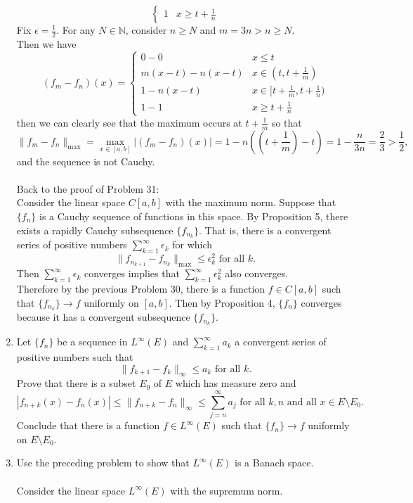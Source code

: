\begin{enumerate}
\[\begin{cases}
            1 &x\ge t+\frac{1}{n}
        \end{cases}
    \]
	Fix $\epsilon=\frac{1}{2}$.
	For any $N\in\mathbb{N}$, consider $n\ge N$ and $m=3n>n\ge N$. 
	\\Then we have
	\[
        (f_m-f_n)(x)=
        \begin{cases}
            0-0 &x\le t\\
            m(x-t)-n(x-t)&x\in(t,t+\frac{1}{m})\\
            1-n(x-t)&x\in[t+\frac{1}{m},t+\frac{1}{n})\\
            1-1 &x\ge t+\frac{1}{n}
        \end{cases}
	\]
	then we can clearly see that the maximum occurs at $t+\frac{1}{m}$ so that 
	\[
		\|f_m-f_n\|_{\max}=\max_{x\in[a,b]}|(f_m-f_n)(x)|=1-n((t+\frac{1}{m})-t)=1-\frac{n}{3n}=\frac{2}{3}>\frac{1}{2},
	\]
	and the sequence is not Cauchy.\\
	\\Back to the proof of Problem 31:
	\\Consider the linear space $C[a,b]$ with the maximum norm. 
	Suppose that $\{f_n\}$ is a Cauchy sequence of functions in this space.
	By Proposition 5, there exists a rapidly Cauchy subsequence $\{f_{n_k}\}$.
	That is, there is a convergent series of positive numbers $\sum_{k=1}^\infty\epsilon_k$ for which
	\[
		\|f_{n_{k+1}}-f_{n_k}\|_{\max}\le\epsilon_k^2\text{ for all }k.
	\]
	Then $\sum_{k=1}^\infty\epsilon_k$ converges implies that $\sum_{k=1}^\infty\epsilon_k^2$ also converges.
	\\Therefore by the previous Problem 30, there is a function $f\in C[a,b]$ such that $\{f_{n_k}\}\to f$ uniformly on $[a,b]$.
	Then by Proposition 4, $\{f_n\}$ converges because it has a convergent subsequence $\{f_{n_k}\}$. 
	\item Let $\{f_n\}$ be a sequence in $L^\infty(E)$ and $\sum_{k=1}^\infty a_k$ a convergent series of positive numbers such that
	\[
		\|f_{k+1}-f_k\|_{\infty}\le a_k\text{ for all }k.
	\]
	Prove that there is a subset $E_0$ of $E$ which has measure zero and 
	\[
		|f_{n+k}(x)-f_n(x)|\le\|f_{n+k}-f_n\|_{\infty}\le\sum_{j=n}^\infty a_j\text{ for all }k,n\text{ and all }x\in E\setminus E_0.
	\]
	Conclude that there is a function $f\in L^\infty(E)$ such that $\{f_n\}\to f$ uniformly on $E\setminus E_0$.
	\item Use the preceding problem to show that $L^\infty(E)$ is a Banach space.\\
	\\Consider the linear space $L^\infty(E)$ with the supremum norm. 

\end{enumerate}
